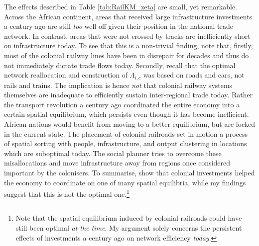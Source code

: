 \documentclass[11pt, oneside]{article}   	%
\begin{document}
The effects described in Table \eqref{tab:RailKM_zeta} are small, yet remarkable. Across the African continent, areas that received large infrastructure investments a century ago are still \emph{too} well off given their position in the national trade network. In contrast, areas that were not crossed by tracks are inefficiently short on infrastructure today. To see that this is a non-trivial finding, note that, firstly, most of the colonial railway lines have been in disrepair for decades and thus do not immediately dictate trade flows today. Secondly, recall that the optimal network reallocation and construction of $\Lambda_{i,c}$ was based on roads and cars, not rails and trains. The implication is hence \emph{not} that colonial railway systems themselves are inadequate to efficiently sustain inter-regional trade today. Rather the transport revolution a century ago coordinated the entire economy into a certain spatial equilibrium, which persists even though it has become inefficient. African nations would benefit from moving to a better equilibrium, but are locked in the current state. The placement of colonial railroads set in motion a process of spatial sorting with people, infrastructure, and output clustering in locations which are suboptimal today. The social planner tries to overcome these misallocations and move infrastructure away from regions once considered important by the colonisers. To summarise, \citeauthor{jedwab_permanent_2016} show that colonial investments helped the economy to coordinate on one of many spatial equilibria, while my findings suggest that this is not the optimal one.\footnote{Note that the spatial equilibrium induced by colonial railroads could have still been optimal \emph{at the time}. My argument solely concerns the persistent effects of investments a century ago on network efficiency \emph{today}.}
\end{document}
